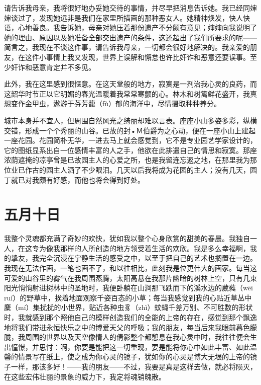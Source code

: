 \documentclass[11pt,oneside]{book}
\begin{document}
\begin{common-format}
请告诉我母亲，我将很好地办妥她交待的事情，并尽早把消息告诉她。我已经同婶婶谈过了，发现她远非是我们在家里所描画的那种恶女人。她精神焕发，快人快语，心地善良。我告诉她，母亲对她压着那份遗产不分颇有意见；婶婶向我说明了她的理由、原因以及她准备全部交出遗产的条件，这还超出了我们所要求的呢——简言之，我现在不谈这件事，请告诉我母亲，一切都会很好地解决的。我亲爱的朋友，在这件小事情上我又发现，世界上误解和懈怠也许比奸诈和恶意还要误事。至少奸诈和恶意肯定并不多见。

此外，我在这里感到很惬意。在这天堂般的地方，寂寞是一剂治我心灵的良药，而这韶华时节正以它明媚的春光温暖着我常常寒颤的心。林木和树篱鲜花盛开，我真想变作金甲虫，遨游于芬芳馥（fù）郁的海洋中，尽情摄取种种养分。

城市本身并不宜人，但周围自然风光之绮丽却难以言表。座座小山多姿多彩，纵横交错，形成一个个秀丽的山谷。已故的封•Ｍ伯爵为之心动，便在一座小山上建起一座花园。花园简朴无华，一进去马上就会感觉到，它不是专业园艺学家设计的，它的图纸显系出自一位感情丰富的人之手，他欲在此排遣自己的情思和寂寞。那座浓荫遮掩的凉亭曾是已故园主人的心爱之所，也是我留连忘返之地，在那里我为那位业已作古的园主人洒了不少眼泪。几天以后我将成为花园的主人；没有几天，园丁就已对我颇有好感，而他也将会得到好处。


\section{五月十日}
我整个灵魂都充满了奇妙的欢快，犹如我以整个心身欣赏的甜美的春晨。我独自一人，在这专为像我那样的人所创造的地方领受着生活的欢欣。我是多么幸福啊，我的挚友，我完全沉浸在宁静生活的感受之中，以至于把自己的艺术也搁置在一边。我现在无法作画，一笔也画不了，和以往相比，此刻我是位更伟大的画家。每当这可爱的山谷里的雾气在我周围蒸腾，太阳高悬在我那片幽暗的树林上空，只有几束阳光悄悄射进树林中的圣地时，我便卧躺在山涧那飞跌而下的溪水边的葳蕤（wēi ruí）的野草中，挨着地面观察千姿百态的小草；每当我感觉到我的心贴近草丛中麇（mí）集扰扰的小世界，贴近各种虫豸（zhì）蚊蝇千差万别、不可胜数的形状时，我就感到那个照他自己的模样创造我们的全能的上帝的存在，感觉到那个飘逸地将我们带进永恒快乐之中的博爱天父的呼吸；我的朋友，每当后来我眼前暮色朦胧，我周围的世界以及天空像情人的倩影整个都憩息在我心灵中时，我往往便会生出憧憬，并思忖：啊，你要是能把这一切重现，要是能将你心中如此丰富、如此温馨的情景写在纸上，使之成为你心灵的镜子，犹如你的心灵是博大无垠的上帝的镜子一样，那该多好！——我的朋友——不过，我要是真是这样去做，就必将陨灭，在这些宏伟壮丽的景象的威力下，我定将魂销魄散。



\end{common-format}
\end{document}
